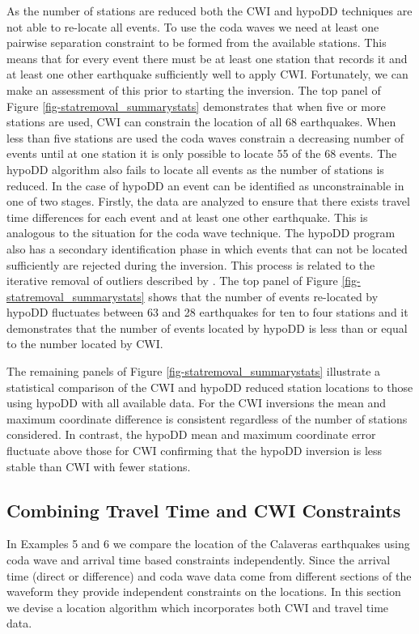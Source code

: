 \documentclass[12pt,double]{article}
\begin{document}
As the number of stations are reduced both the CWI and hypoDD
techniques are not able to re-locate all events. To use the coda
waves we need at least one pairwise separation constraint to be
formed from the available stations. This means that for every event
there must be at least one station that records it and at least one
other earthquake sufficiently well to apply CWI. Fortunately, we can
make an assessment of this prior to starting the inversion. The top
panel of Figure \ref{fig-statremoval_summarystats} demonstrates that
when five or more stations are used, CWI can constrain the location
of all 68 earthquakes. When less than five stations are used the
coda waves constrain a decreasing number of events until at one
station it is only possible to locate 55 of the 68 events. The
hypoDD algorithm also fails to locate all events as the number of
stations is reduced. In the case of hypoDD an event can be
identified as unconstrainable in one of two stages. Firstly, the
data are analyzed to ensure that there exists travel time
differences for each event and at least one other earthquake. This
is analogous to the situation for the coda wave technique. The
hypoDD program also has a secondary identification phase in which
events that can not be located sufficiently are rejected during the
inversion. This process is related to the iterative removal of
outliers described by \citet{dr_Waldhauser00a}. The top panel of
Figure \ref{fig-statremoval_summarystats} shows that the number of
events re-located by hypoDD fluctuates between 63 and 28 earthquakes
for ten to four stations and it demonstrates that the number of
events located by hypoDD is less than or equal to the number located
by CWI.


The remaining panels of Figure \ref{fig-statremoval_summarystats}
illustrate a statistical comparison of the CWI and hypoDD reduced
station locations to those using hypoDD with all available data. For
the CWI inversions the mean and maximum coordinate difference is
consistent regardless of the number of stations considered. In
contrast, the hypoDD mean and maximum coordinate error fluctuate
above those for CWI confirming that the hypoDD inversion is less
stable than CWI with fewer stations.

\vspace{2em}
\begin{centering}
\section*{Combining Travel Time and CWI Constraints}
\end{centering}
\label{sec:CalaverasLoc-CWIandTT}
In Examples 5 and 6 we compare the location of the Calaveras
earthquakes using coda wave and arrival time based constraints
independently. Since the arrival time (direct or difference) and
coda wave data
 come from different sections of the waveform they provide independent constraints on the locations.
 In this section we devise a location algorithm which incorporates
 both CWI and travel time data.
\end{document}
